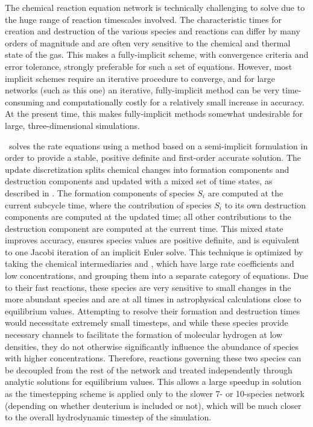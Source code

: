 The chemical reaction equation network is technically challenging to solve due
to the huge range of reaction timescales involved.  The characteristic times
for creation and destruction of the various species and reactions can differ by
many orders of magnitude and are often very sensitive to the chemical and
thermal state of the gas.  This makes a fully-implicit scheme, with convergence
criteria and error tolerance, strongly preferable for such a set of equations.
However, most implicit schemes require an iterative procedure to converge, and
for large networks (such as this one) an iterative, fully-implicit method can
be very time-consuming and computationally costly for a relatively small
increase in accuracy.  At the present time, this makes fully-implicit methods
somewhat undesirable for large, three-dimensional simulations.

\enzo\ solves the rate equations using a method based on a semi-implicit
formulation in order to provide a stable, positive definite and first-order
accurate solution.  The update discretization splits chemical changes into
formation components and destruction components and updated with a mixed set of
time states, as described in \citet{anninos97}.  The formation components of
species $S_i$ are computed at the current subcycle time, where the contribution
of species $S_i$ to its own destruction components are computed at the updated
time; all other contributions to the destruction component are computed at the
current time.  This mixed state improves accuracy, ensures species values
are positive definite, and is equivalent to one Jacobi iteration of an implicit
Euler solve.  This technique is optimized by taking the chemical intermediaries
\Hm and \HHp, which have large rate coefficients and low concentrations, and
grouping them into a separate category of equations.  Due to their fast
reactions, these species are very sensitive to small changes in the more
abundant species and are at all times in astrophysical calculations close to
equilibrium values.  Attempting to resolve their formation and destruction
times would necessitate extremely small timesteps, and while these species
provide necessary channels to facilitate the formation of molecular hydrogen at
low densities, they do not otherwise significantly influence the abundance of
species with higher concentrations.  Therefore, reactions governing these two
species can be decoupled from the rest of the network and treated independently
through analytic solutions for equilibrium values.  This allows a large speedup
in solution as the timestepping scheme is applied only to the slower 7- or
10-species network (depending on whether deuterium is included or not), which
will be much closer to the overall hydrodynamic timestep of the simulation.

